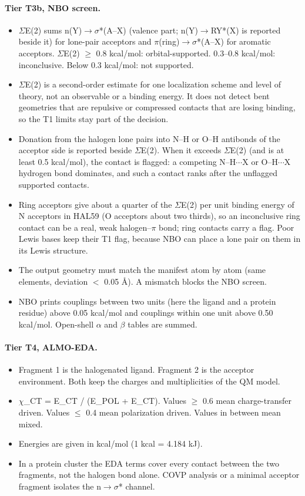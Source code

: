 \paragraph{Tier T3b, NBO screen.}
\begin{itemize}[nosep,leftmargin=*]
\item $\Sigma$E(2) sums n(Y)$\to\sigma$*(A--X) (valence part; n(Y)$\to$RY*(X) is reported beside it) for lone-pair acceptors and $\pi$(ring)$\to\sigma$*(A--X) for aromatic acceptors. $\Sigma$E(2) $\ge$ 0.8 kcal/mol: orbital-supported. 0.3--0.8 kcal/mol: inconclusive. Below 0.3 kcal/mol: not supported.
\item $\Sigma$E(2) is a second-order estimate for one localization scheme and level of theory, not an observable or a binding energy. It does not detect bent geometries that are repulsive or compressed contacts that are losing binding, so the T1 limits stay part of the decision.
\item Donation from the halogen lone pairs into N--H or O--H antibonds of the acceptor side is reported beside $\Sigma$E(2). When it exceeds $\Sigma$E(2) (and is at least 0.5 kcal/mol), the contact is flagged: a competing N--H$\cdots$X or O--H$\cdots$X hydrogen bond dominates, and such a contact ranks after the unflagged supported contacts.
\item Ring acceptors give about a quarter of the $\Sigma$E(2) per unit binding energy of N acceptors in HAL59 (O acceptors about two thirds), so an inconclusive ring contact can be a real, weak halogen--$\pi$ bond; ring contacts carry a flag. Poor Lewis bases keep their T1 flag, because NBO can place a lone pair on them in its Lewis structure.
\item The output geometry must match the manifest atom by atom (same elements, deviation $<$ 0.05 \AA{}). A mismatch blocks the NBO screen.
\item NBO prints couplings between two units (here the ligand and a protein residue) above 0.05 kcal/mol and couplings within one unit above 0.50 kcal/mol. Open-shell $\alpha$ and $\beta$ tables are summed.
\end{itemize}
\paragraph{Tier T4, ALMO-EDA.}
\begin{itemize}[nosep,leftmargin=*]
\item Fragment 1 is the halogenated ligand. Fragment 2 is the acceptor environment. Both keep the charges and multiplicities of the QM model.
\item $\chi$\_CT = E\_CT / (E\_POL + E\_CT). Values $\ge$ 0.6 mean charge-transfer driven. Values $\le$ 0.4 mean polarization driven. Values in between mean mixed.
\item Energies are given in kcal/mol (1 kcal = 4.184 kJ).
\item In a protein cluster the EDA terms cover every contact between the two fragments, not the halogen bond alone. COVP analysis or a minimal acceptor fragment isolates the n$\to\sigma$* channel.
\end{itemize}
